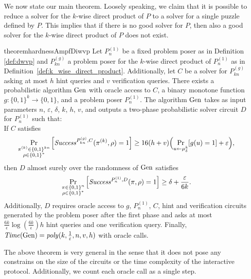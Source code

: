 We now state our main theorem. Loosely speaking, we claim that it is possible to reduce a solver for the $k$-wise direct product of $P$
to a solver for a single puzzle defined by $P$. This implies that if there is no good solver for $P$, then also a good solver for
the $k$-wise direct product of $P$ does not exist.
%
\begin{restatable}{theorem}{hardnessAmpfDiwvp}
\label{th:sec_amp_for_dwvp}
Let $P_{n}^{(1)}$ be a fixed problem poser as in Definition \ref{def:dwvp}
and $P_{kn}^{(g)}$ a problem poser for the $k$-wise direct product of $P_{n}^{(1)}$ as in Definition~\ref{def:k_wise_direct_product}.
Additionally, let $C$ be a solver for $P_{kn}^{(g)}$ asking at most $h$ hint queries and $v$ verification queries.
There exists a probabilistic algorithm $\operatorname{\text{Gen}}$ with oracle access to $C$,
a binary monotone function $g:\{0,1\}^k \rightarrow \{0,1\}$, and a problem poser $P_{n}^{(1)}$.
The algorithm $\operatorname{\text{Gen}}$ takes as input parameters $n$, $\varepsilon$, $\delta$, $k$, $h$, $v$,
and outputs a two-phase probabilistic solver circuit $D$ for $P_{n}^{(1)}$ such that: \\
If $C$ satisfies
  \begin{align}
    \label{th_sec_amp_dwvp_assum}
    \underset{\substack{\pi^{(k)} \in \{0,1\}^{kn} \\ \rho \in \{0,1\}^{*}}}{\Pr}\left[\mathit{Success}^{P_{kn}^{(g)}, C}(\pi^{(k)}, \rho) = 1\right]
    \geq 16(h+v)\Bigl(\underset{u \leftarrow \mu_\delta^k}{\Pr}[g(u) = 1] + \varepsilon \Bigr),
  \end{align}
then $D$ almost surely over the randomness of $\operatorname{\text{Gen}}$ satisfies
  \begin{align}
    \underset{\substack{\pi \in \{0,1\}^{n} \\ \rho \in \{0,1\}^{*}}}
    {\Pr}\left[\operatorname{\mathit{Success}}^{P_{n}^{(1)},D}(\pi, \rho) = 1\right] \geq \delta + \frac{\varepsilon}{6k}.
  \end{align}
Additionally, $D$ requires oracle access to $g$, $P_{n}^{(1)}$, $C$, hint and verification circuits generated by
the problem poser after the first phase and asks at most $\frac{6k}{\epsilon}\log\left(\frac{6k}{\epsilon}\right) h$
hint queries and one verification query. Finally, $\operatorname{\mathit{Time}}(\operatorname{\text{Gen}}) = \operatorname{\mathit{poly}}(k, \frac{1}{\varepsilon}, n, v, h)$ with oracle calls.
\end{restatable}

The above theorem is very general in the sense that it does not pose any constrains
on the size of the circuits or the time complexity of the interactive protocol.
Additionally, we count each oracle call as a single step.

